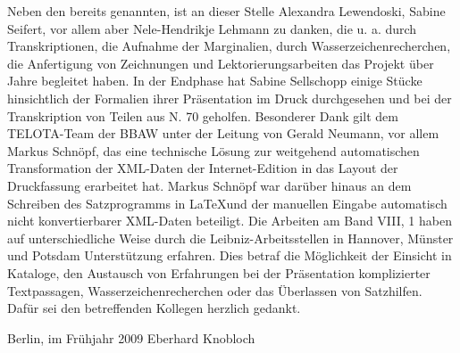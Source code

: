 Neben den bereits genannten, ist an dieser Stelle Alexandra Lewendoski, Sabine Seifert, vor allem aber Nele-Hendrikje Lehmann zu danken, die u. a. durch Transkriptionen, die Aufnahme der Marginalien, durch Wasserzeichenrecherchen, die Anfertigung von Zeichnungen und Lektorierungsarbeiten das Projekt \"{u}ber Jahre begleitet haben. In der Endphase hat Sabine Sellschopp einige St\"{u}cke hinsichtlich der Formalien ihrer Pr\"{a}sentation im Druck durchgesehen und bei der Transkription von Teilen aus N. 70 geholfen. Besonderer Dank gilt dem TELOTA-Team der BBAW unter der Leitung von Gerald Neumann, vor allem Markus Schn\"{o}pf, das eine tech\-nische L\"{o}sung zur weitgehend automatischen Transformation der XML-Daten der Internet-Edition in das Layout der Druckfassung erarbeitet hat. Markus Schn\"{o}pf war dar\"{u}ber hinaus an dem Schreiben des Satzprogramms in \LaTeX und der manuellen Eingabe automatisch nicht konvertierbarer XML-Daten beteiligt. Die Arbeiten am Band VIII, 1 haben auf unterschiedliche Weise durch die Leibniz-Arbeitsstellen in Hannover, M\"{u}nster und Potsdam Unterst\"{u}tzung erfahren. Dies betraf die M\"{o}glichkeit der Einsicht in Kataloge, den Austausch von Erfahrungen bei der Pr\"{a}sentation komplizierter Textpassagen, Wasserzeichenrecherchen oder das \"{U}berlassen von Satzhilfen. Daf\"{u}r sei den betreffenden Kollegen herzlich gedankt.\par \vspace{1.0ex}
Berlin, im Fr\"{u}hjahr 2009 \hfill Eberhard Knobloch\par